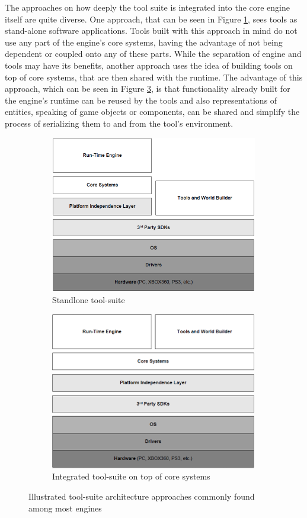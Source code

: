 The approaches on how deeply the tool suite is integrated into the core engine itself are quite diverse. One approach, that can be seen in Figure \ref{fig:tools_standalone}, sees tools as stand-alone software applications. Tools built with this approach in mind do not use any part of the engine's core systems, having the advantage of not being dependent or coupled onto any of these parts. 
While the separation of engine and tools may have its benefits, another approach uses the idea of building tools on top of core systems, that are then shared with the runtime. The advantage of this approach, which can be seen in Figure \ref{fig:tools_integrated}, is that functionality already built for the engine's runtime can be reused by the tools and also representations of entities, speaking of game objects or components, can be shared and simplify the process of serializing them to and from the tool's environment.

\begin{figure}[h!]
	\begin{subfigure}{0.5\textwidth}
		\centering
		\centering \includegraphics[width=0.5 \linewidth]{PICs/tools_arch_standalone.png}
		\caption{Standlone tool-suite}
		\label{fig:tools_standalone}
	\end{subfigure}%
	\begin{subfigure}{0.5\textwidth}
		\centering
		\centering \includegraphics[width=0.5 \linewidth]{PICs/tools_arch_integrated.png}
		\caption{Integrated tool-suite on top of core systems}
		\label{fig:tools_integrated}
	\end{subfigure}
	
	\caption{Illustrated tool-suite architecture approaches commonly found among most engines}
\end{figure}

